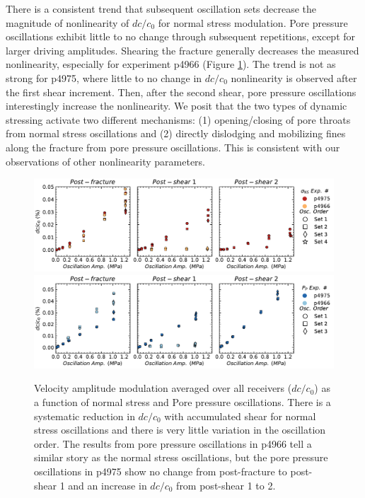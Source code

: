\documentclass[letterpaper,10pt]{article}
\begin{document}
	There is a consistent trend that subsequent oscillation sets decrease the magnitude of nonlinearity of $ dc/c_0 $ for normal stress modulation. Pore pressure oscillations exhibit little to no change through subsequent repetitions, except for larger driving amplitudes.  Shearing the fracture generally decreases the measured nonlinearity, especially for experiment p4966 (Figure \ref{fig:dc_plots2}). The trend is not as strong for p4975, where little to no change in $ dc/c_0 $ nonlinearity is observed after the first shear increment. Then, after the second shear, pore pressure oscillations interestingly increase the nonlinearity. We posit that the two types of dynamic stressing activate two different mechanisms: (1) opening/closing of pore throats from normal stress oscillations and (2) directly dislodging and mobilizing fines along the fracture from pore pressure oscillations. This is consistent with our observations of other nonlinearity parameters. 
	\clearpage
	
	\begin{figure}[ht]
		\centering
		\includegraphics[width=1\columnwidth]{dc_amp_NS}
		\includegraphics[width=1\columnwidth]{dc_amp_PP}
		\caption{Velocity amplitude modulation averaged over all receivers ($ dc/c_0 $) as a function of normal stress and Pore pressure oscillations. There is a systematic reduction in $ dc/c_0 $ with accumulated shear for normal stress oscillations and there is very little variation in the oscillation order. The results from pore pressure oscillations in p4966 tell a similar story as the normal stress oscillations, but the pore pressure oscillations in p4975 show no change from post-fracture to post-shear 1 and an increase in $ dc/c_0 $ from post-shear 1 to 2.}
		\label{fig:dc_plots2}
	\end{figure}
	\clearpage
	
\end{document}
